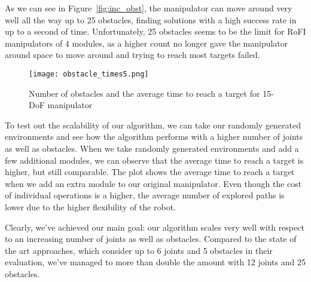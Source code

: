 As we can see in Figure~\ref{fig:inc_obst}, the manipulator can move around very well all the way up to 25 obstacles, finding solutions with a high success rate in up to a second of time. Unfortunately, 25 obstacles seems to be the limit for RoFI manipulators of 4 modules, as a higher count no longer gave the manipulator around space to move around and trying to reach most targets failed.

\begin{wrapfigure}{r}{0.4\textwidth}
  \centering
  \texttt{[image: obstacle\_times5.png]}
  \caption{Number of obstacles and the average time to reach a target for 15-DoF manipulator}
\end{wrapfigure}

To test out the scalability of our algorithm, we can take our randomly generated environments and see how the algorithm performs with a higher number of joints as well as obstacles. When we take randomly generated environments and add a few additional modules, we can observe that the average time to reach a target is higher, but still comparable. The plot shows the average time to reach a target when we add an extra module to our original manipulator. Even though the cost of individual operations is a higher, the average number of explored paths is lower due to the higher flexibility of the robot.

Clearly, we've achieved our main goal: our algorithm scales very well with respect to an increasing number of joints as well as obstacles. Compared to the state of the art approaches, which consider up to 6 joints and 5 obstacles in their evaluation, we've managed to more than double the amount with 12 joints and 25 obstacles.
